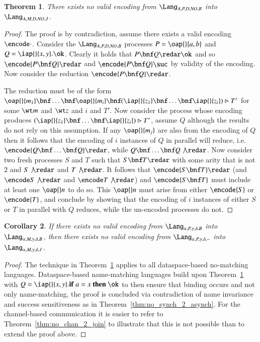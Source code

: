 \documentclass[submission,copyright,creativecommons]{eptcs}
\newtheorem{theorem}{Theorem}[section]
\newtheorem{corollary}[theorem]{Corollary}
\newcommand{\ift}[3]{{\bf if}\ #1=#2\ {\bf then}\ #3}
\newcommand{\join}[1]{(#1)\rhd }
\begin{document}
\begin{theorem}
\label{thm:no_poly_2_join}
There exists no valid encoding from $\Lang_{A,P,D,\mathit{NO},B}$ into $\Lang_{A,M,D,\mathit{NO},J}$.
\end{theorem}
\begin{proof}
The proof is by contradiction, assume there exists a valid encoding $\encode\cdot$.
Consider the $\Lang_{A,P,D,\mathit{NO},B}$ processes $P=\oap {} {a,b}$ and $Q=\iap {} {x,y} .\ok$.
Clearly it holds that $P\bnf Q\redar\ok$ and so $\encode{P\bnf Q}\redar$ and $\encode{P\bnf Q}\suc$
by validity of the encoding. Now consider the reduction $\encode{P\bnf Q}\redar$.

The reduction must be of the form
$\oap {} {m_1} \bnf \ldots \bnf \oap {} {m_i} \bnf \join {\iap {} {z_1}\bnf\ldots\bnf\iap {} {z_i}} T'$
for some $\wt m$ and $\wt z$ and $i$ and $T'$.
Now consider the process whose encoding produces $\join {\iap {} {z_1}\bnf\ldots\bnf\iap {} {z_i}} T'$,
assume $Q$ although the results do not rely on this assumption.
If any $\oap {} {m_j}$ are also from the encoding of $Q$ then it follows that the encoding of
$i$ instances of $Q$ in parallel will reduce, i.e.~$\encode{Q\bnf \ldots\bnf Q}\redar$, while
$Q\bnf \ldots \bnf Q\not\redar$.
Now consider two fresh processes $S$ and $T$ such that $S\bnf T\redar$ with some arity that is not $2$
and $S\not\redar$ and $T\not\redar$.
It follows that $\encode{S\bnf T}\redar$ (and $\encode S \not\redar$ and $\encode T \not\redar$)
and $\encode {S\bnf T}$ must include at least one $\oap {} n$ to do so.
This $\oap {} n$ must arise from either $\encode{S}$ or $\encode {T}$, and conclude by showing that
the encoding of $i$ instances of either $S$ or $T$ in parallel with $Q$ reduces, while the
un-encoded processes do not.
\end{proof}

\begin{corollary}
If there exists no valid encoding from
$\Lang_{\alpha,P,\gamma,\delta,B}$ into $\Lang_{\alpha,M,\gamma,\delta,B}$, then there exists
no valid encoding from $\Lang_{\alpha,P,\gamma,\delta,-}$ into $\Lang_{\alpha,M,\gamma,\delta,J}$.
\end{corollary}
\begin{proof}
The technique in Theorem~\ref{thm:no_poly_2_join} applies to all dataspace-based no-matching languages.
Dataspace-based name-matching languages build upon Theorem~\ref{thm:no_poly_2_join} with
$Q=\iap {} {x,y}.\ift a x \ok$ to then ensure that binding occurs and not only name-matching,
the proof is concluded via contradiction of name invariance and success sensitiveness as in
Theorem~\ref{thm:no_synch_2_asynch}.
For the channel-based communication it is easier to refer to Theorem~\ref{thm:no_chan_2_join} to
illustrate that this is not possible than to extend the proof above.
\end{proof}
\end{document}

